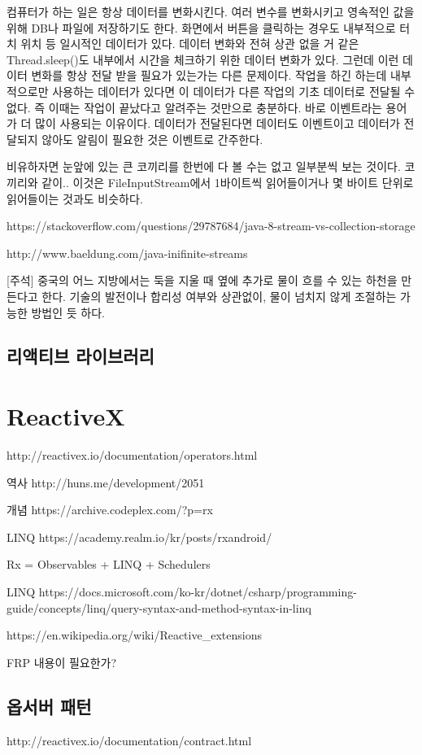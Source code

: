 \documentclass{book}
\begin{document}
컴퓨터가 하는 일은 항상 데이터를 변화시킨다. 여러 변수를 변화시키고 영속적인 값을 위해 DB나 파일에 저장하기도 한다. 화면에서 버튼을 클릭하는 경우도 내부적으로 터치 위치 등 일시적인 데이터가 있다. 데이터 변화와 전혀 상관 없을 거 같은 Thread.sleep()도 내부에서 시간을 체크하기 위한 데이터 변화가 있다. 그런데 이런 데이터 변화를 항상 전달 받을 필요가 있는가는 다른 문제이다. 작업을 하긴 하는데 내부적으로만 사용하는 데이터가 있다면 이 데이터가 다른 작업의 기초 데이터로 전달될 수 없다. 즉 이때는 작업이 끝났다고 알려주는 것만으로 충분하다. 바로 이벤트라는 용어가 더 많이 사용되는 이유이다. 데이터가 전달된다면 데이터도 이벤트이고 데이터가 전달되지 않아도 알림이 필요한 것은 이벤트로 간주한다. 

비유하자면 눈앞에 있는 큰 코끼리를 한번에 다 볼 수는 없고 일부분씩 보는 것이다. 코끼리와 같이.. 
이것은 FileInputStream에서 1바이트씩 읽어들이거나 몇 바이트 단위로 읽어들이는 것과도 비슷하다.


https://stackoverflow.com/questions/29787684/java-8-stream-vs-collection-storage

http://www.baeldung.com/java-inifinite-streams

[주석] 중국의 어느 지방에서는 둑을 지울 때 옆에 추가로 물이 흐를 수 있는 하천을 만든다고 한다. 기술의 발전이나 합리성 여부와 상관없이, 물이 넘치지 않게 조절하는 가능한 방법인 듯 하다.

\subsection{리액티브 라이브러리}

\section{ReactiveX}
http://reactivex.io/documentation/operators.html

역사
http://huns.me/development/2051

개념
https://archive.codeplex.com/?p=rx

LINQ
https://academy.realm.io/kr/posts/rxandroid/

Rx = Observables + LINQ + Schedulers

LINQ
https://docs.microsoft.com/ko-kr/dotnet/csharp/programming-guide/concepts/linq/query-syntax-and-method-syntax-in-linq

https://en.wikipedia.org/wiki/Reactive_extensions

FRP 내용이 필요한가?

\subsection{옵서버 패턴}
http://reactivex.io/documentation/contract.html
\end{document}
